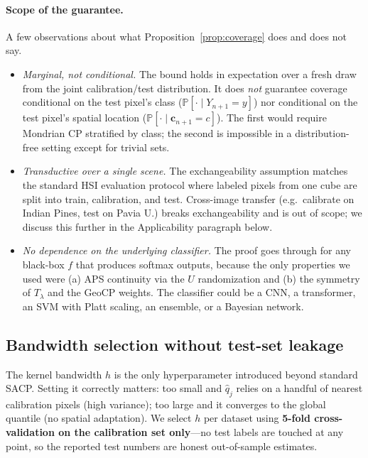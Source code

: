 \documentclass[11pt]{article}
\newcommand{\1}{\mathbf{1}}
\newcommand{\Prob}{\mathbb{P}}
\begin{document}
\paragraph{Scope of the guarantee.} A few observations about what Proposition~\ref{prop:coverage} does and does not say.
\begin{itemize}[topsep=2pt,itemsep=2pt,leftmargin=1.5em]
    \item \emph{Marginal, not conditional.} The bound holds in expectation over a fresh draw from the joint calibration/test distribution. It does \emph{not} guarantee coverage conditional on the test pixel's class ($\Prob[\cdot \mid Y_{n+1} = y]$) nor conditional on the test pixel's spatial location ($\Prob[\cdot \mid \mathbf{c}_{n+1} = c]$). The first would require Mondrian CP \citep{vovk2005algorithmic} stratified by class; the second is impossible in a distribution-free setting except for trivial sets.
    \item \emph{Transductive over a single scene.} The exchangeability assumption matches the standard HSI evaluation protocol where labeled pixels from one cube are split into train, calibration, and test. Cross-image transfer (e.g.\ calibrate on Indian Pines, test on Pavia U.) breaks exchangeability and is out of scope; we discuss this further in the Applicability paragraph below.
    \item \emph{No dependence on the underlying classifier.} The proof goes through for any black-box $f$ that produces softmax outputs, because the only properties we used were (a) APS continuity via the $U$ randomization and (b) the symmetry of $T_\lambda$ and the GeoCP weights. The classifier could be a CNN, a transformer, an SVM with Platt scaling, an ensemble, or a Bayesian network.
\end{itemize}

\subsection{Bandwidth selection without test-set leakage}
\label{subsec:bandwidth}

The kernel bandwidth $h$ is the only hyperparameter introduced beyond standard SACP. Setting it correctly matters: too small and $\hat q_j$ relies on a handful of nearest calibration pixels (high variance); too large and it converges to the global quantile (no spatial adaptation). We select $h$ per dataset using \textbf{5-fold cross-validation on the calibration set only}---no test labels are touched at any point, so the reported test numbers are honest out-of-sample estimates.
\end{document}
